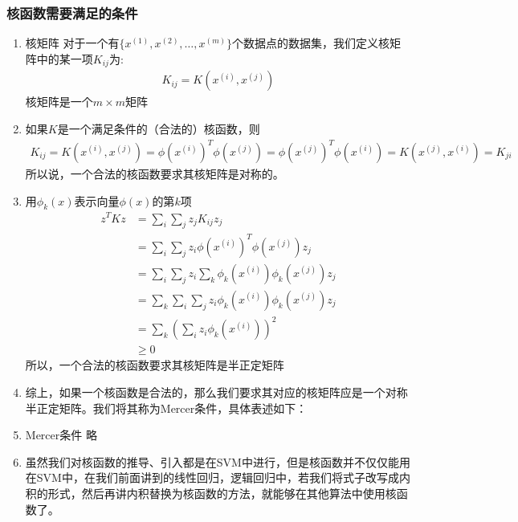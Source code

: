 \subsubsection{核函数需要满足的条件}
\begin{enumerate}
	\item 核矩阵
	对于一个有$\{x^{(1)}, x^{(2)}, \dots, x^{(m)}\}$个数据点的数据集，我们定义核矩阵中的某一项$K_{ij}$为:
	\begin{align}
		K_{ij} = K(x^{(i)}, x^{(j)})
	\end{align}
	核矩阵是一个$m\times m$矩阵
	\item 如果$K$是一个满足条件的（合法的）核函数，则
	\begin{align}
		K_{ij} = K(x^{(i)}, x^{(j)}) = \phi(x^{(i)})^T\phi(x^{(j)}) = \phi(x^{(j)})^T\phi(x^{(i)}) = K(x^{(j)}, x^{(i)}) = K_{ji}
	\end{align}
	所以说，一个合法的核函数要求其核矩阵是对称的。
	\item 用$\phi_k(x)$表示向量$\phi(x)$的第$k$项
	\begin{align}
		z^TKz &= \sum_{i}\sum_{j}z_j K_{ij} z_j \\
		&= \sum_{i}\sum_{j} z_i \phi(x^{(i)})^T \phi(x^{(j)}) z_j \\
		&= \sum_{i}\sum_{j}z_i \sum_{k}\phi_k(x^{(i)})\phi_k(x^{(j)})z_j \\
		&= \sum_{k}\sum_{i}\sum_{j}z_i \phi_k(x^{(i)}) \phi_k(x^{(j)}) z_j \\
		&= \sum_{k} \left(\sum_{i}z_i \phi_k(x^{(i)}) \right)^2 \\
		& \geq 0
	\end{align}
	所以，一个合法的核函数要求其核矩阵是半正定矩阵
	\item 综上，如果一个核函数是合法的，那么我们要求其对应的核矩阵应是一个对称半正定矩阵。我们将其称为Mercer条件，具体表述如下：
	\item Mercer条件
	略
	\item 虽然我们对核函数的推导、引入都是在SVM中进行，但是核函数并不仅仅能用在SVM中，在我们前面讲到的线性回归，逻辑回归中，若我们将式子改写成内积的形式，然后再讲内积替换为核函数的方法，就能够在其他算法中使用核函数了。
\end{enumerate}

